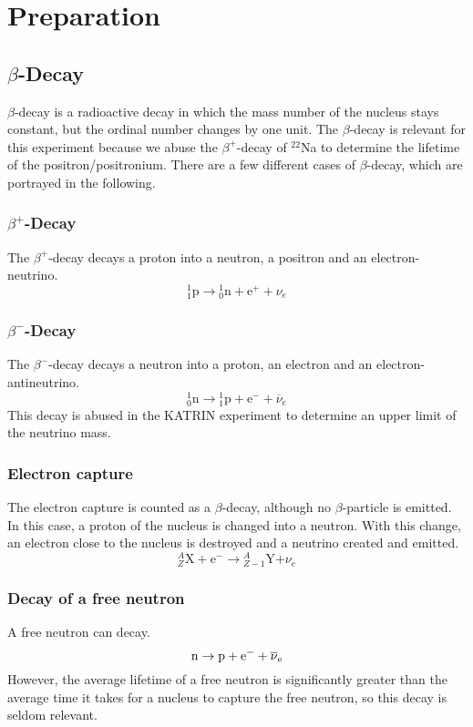 \chapter{Preparation}

\section{$\beta$-Decay}
$\beta$-decay is a radioactive decay in which the mass number of the nucleus stays constant, but the ordinal number changes by one unit. The $\beta$-decay is relevant for this experiment because we abuse the $\beta^+$-decay of $^{22}$Na to determine the lifetime of the positron/positronium. There are a few different cases of $\beta$-decay, which are portrayed in the following.
\subsection{$\beta^+$-Decay}
The $\beta^+$-decay decays a proton into a neutron, a positron and an electron-neutrino.
$${}_{{1}}^{{1}}{\mathrm {p}}\to {}_{{0}}^{{1}}{\mathrm {n}}+{\mathrm {e}}^{{+}}+\nu _{e}$$

\subsection{$\beta^-$-Decay}
The $\beta^-$-decay decays a neutron into a proton, an electron and an electron-antineutrino.
$${}_{{0}}^{{1}}{\mathrm {n}}\to {}_{{1}}^{{1}}{\mathrm {p}}+{\mathrm {e}}^{{-}}+\overline {\nu }_{e}$$
This decay is abused in the KATRIN experiment to determine an upper limit of the neutrino mass. 
\subsection{Electron capture}
The electron capture is counted as a $\beta$-decay, although no $\beta$-particle is emitted. In this case, a proton of the nucleus is changed into a neutron. With this change, an electron close to the nucleus is destroyed and a neutrino created and emitted.  
$${\displaystyle {}_{Z}^{A}\mathrm {X} +\mathrm {e} ^{-}\to {}_{Z-1}^{A}\mathrm {Y} \mathrm {+} \nu _{e}}$$

\subsection{Decay of a free neutron}
A free neutron can decay. 
$${\hbox{n}}\to {\hbox{p}}+{\hbox{e}}^{-}+\overline {\nu }_{{{\mathrm {e}}}}$$
However, the average lifetime of a free neutron is significantly greater than the average time it takes for a nucleus to capture the free neutron, so this decay is seldom relevant.
